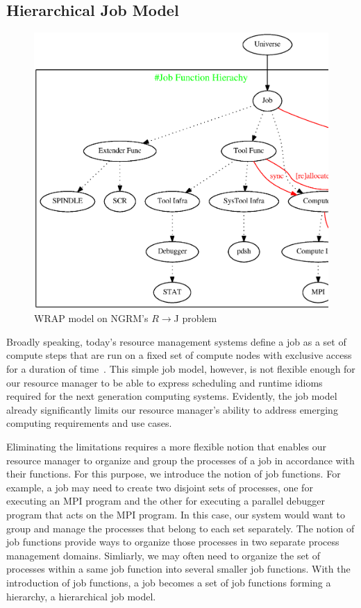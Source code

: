 \subsection{Hierarchical Job Model}

\begin{figure}
  \centering
    \includegraphics[width=5.0in]{../fig/wrap_graph.ps}
  \caption{WRAP model on NGRM's $R \rightarrow $J problem}
  \label{fig:jobrm}
\end{figure}

Broadly speaking, today's resource management systems define a job as a set
of compute steps that are run on a fixed set of compute nodes with exclusive access for
a duration of time~\cite{Jette02slurm}.
This simple job model, however, is not flexible enough for our resource manager to
be able to express scheduling and runtime idioms required for the next generation computing systems.
Evidently, the job model already significantly limits
our resource manager's ability to address emerging
computing requirements and use cases.

Eliminating the limitations requires a more flexible notion that enables
our resource manager to organize and group the processes of a job
in accordance with their functions. For this purpose,
we introduce the notion of job functions. For example,
a job may need to create two disjoint sets of processes,
one for executing an MPI program and
the other for executing a parallel debugger program
that acts on the MPI program.
In this case, our system would want to group and manage the processes
that belong to each set separately. The notion of job functions
provide ways to organize those processes in two separate process management
domains. Simliarly, we may often need to organize
the set of processes within a same job function
into several smaller job functions. With the introduction of job functions,
a job becomes a set of job functions forming a hierarchy,
a hierarchical job model.

